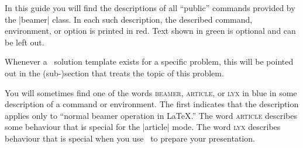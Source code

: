 In this guide you will find the descriptions of all ``public''
commands provided by the |beamer| class. In each such
description, the described command, environment, or option is printed 
in red. Text shown in green is optional and can be left out.

Whenever a \beamer\ solution template exists for a specific problem, this will
be pointed out in the (sub-)section that treats the topic of this
problem. 

You will sometimes find one of the words \textsc{beamer},
\textsc{article}, or \textsc{lyx} in blue in some description of a
command or environment. The first indicates that the description
applies only to ``normal beamer operation in \LaTeX.'' The word
\textsc{article} describes some behaviour that is special for the
|article| mode. The word \textsc{lyx} describes behaviour that is
special when you use \LyX\ to prepare your presentation.  


